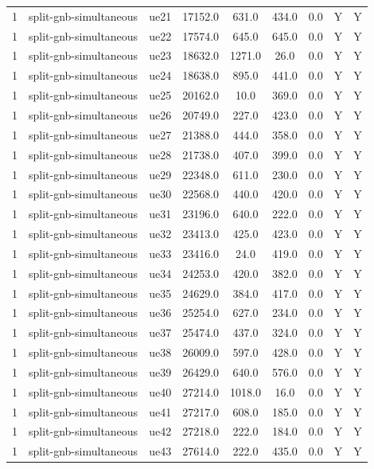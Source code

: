\begin{table}[ht]
\begin{tabular}{|c|c|c|c|c|c|c|c|c|}
1 & split-gnb-simultaneous & ue21 & 17152.0 & 631.0 & 434.0 & 0.0 & Y & Y \\
1 & split-gnb-simultaneous & ue22 & 17574.0 & 645.0 & 645.0 & 0.0 & Y & Y \\
1 & split-gnb-simultaneous & ue23 & 18632.0 & 1271.0 & 26.0 & 0.0 & Y & Y \\
1 & split-gnb-simultaneous & ue24 & 18638.0 & 895.0 & 441.0 & 0.0 & Y & Y \\
1 & split-gnb-simultaneous & ue25 & 20162.0 & 10.0 & 369.0 & 0.0 & Y & Y \\
1 & split-gnb-simultaneous & ue26 & 20749.0 & 227.0 & 423.0 & 0.0 & Y & Y \\
1 & split-gnb-simultaneous & ue27 & 21388.0 & 444.0 & 358.0 & 0.0 & Y & Y \\
1 & split-gnb-simultaneous & ue28 & 21738.0 & 407.0 & 399.0 & 0.0 & Y & Y \\
1 & split-gnb-simultaneous & ue29 & 22348.0 & 611.0 & 230.0 & 0.0 & Y & Y \\
1 & split-gnb-simultaneous & ue30 & 22568.0 & 440.0 & 420.0 & 0.0 & Y & Y \\
1 & split-gnb-simultaneous & ue31 & 23196.0 & 640.0 & 222.0 & 0.0 & Y & Y \\
1 & split-gnb-simultaneous & ue32 & 23413.0 & 425.0 & 423.0 & 0.0 & Y & Y \\
1 & split-gnb-simultaneous & ue33 & 23416.0 & 24.0 & 419.0 & 0.0 & Y & Y \\
1 & split-gnb-simultaneous & ue34 & 24253.0 & 420.0 & 382.0 & 0.0 & Y & Y \\
1 & split-gnb-simultaneous & ue35 & 24629.0 & 384.0 & 417.0 & 0.0 & Y & Y \\
1 & split-gnb-simultaneous & ue36 & 25254.0 & 627.0 & 234.0 & 0.0 & Y & Y \\
1 & split-gnb-simultaneous & ue37 & 25474.0 & 437.0 & 324.0 & 0.0 & Y & Y \\
1 & split-gnb-simultaneous & ue38 & 26009.0 & 597.0 & 428.0 & 0.0 & Y & Y \\
1 & split-gnb-simultaneous & ue39 & 26429.0 & 640.0 & 576.0 & 0.0 & Y & Y \\
1 & split-gnb-simultaneous & ue40 & 27214.0 & 1018.0 & 16.0 & 0.0 & Y & Y \\
1 & split-gnb-simultaneous & ue41 & 27217.0 & 608.0 & 185.0 & 0.0 & Y & Y \\
1 & split-gnb-simultaneous & ue42 & 27218.0 & 222.0 & 184.0 & 0.0 & Y & Y \\
1 & split-gnb-simultaneous & ue43 & 27614.0 & 222.0 & 435.0 & 0.0 & Y & Y \\

\end{tabular}
\end{table}
